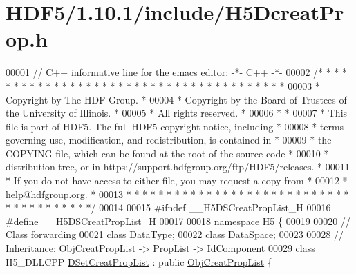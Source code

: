 \hypertarget{_h_d_f5_21_810_81_2include_2_h5_dcreat_prop_8h_source}{}\section{H\+D\+F5/1.10.1/include/\+H5\+Dcreat\+Prop.h}
\label{_h_d_f5_21_810_81_2include_2_h5_dcreat_prop_8h_source}

\begin{DoxyCode}
00001 \textcolor{comment}{// C++ informative line for the emacs editor: -*- C++ -*-}
00002 \textcolor{comment}{/* * * * * * * * * * * * * * * * * * * * * * * * * * * * * * * * * * * * * * *}
00003 \textcolor{comment}{ * Copyright by The HDF Group.                                               *}
00004 \textcolor{comment}{ * Copyright by the Board of Trustees of the University of Illinois.         *}
00005 \textcolor{comment}{ * All rights reserved.                                                      *}
00006 \textcolor{comment}{ *                                                                           *}
00007 \textcolor{comment}{ * This file is part of HDF5.  The full HDF5 copyright notice, including     *}
00008 \textcolor{comment}{ * terms governing use, modification, and redistribution, is contained in    *}
00009 \textcolor{comment}{ * the COPYING file, which can be found at the root of the source code       *}
00010 \textcolor{comment}{ * distribution tree, or in https://support.hdfgroup.org/ftp/HDF5/releases.  *}
00011 \textcolor{comment}{ * If you do not have access to either file, you may request a copy from     *}
00012 \textcolor{comment}{ * help@hdfgroup.org.                                                        *}
00013 \textcolor{comment}{ * * * * * * * * * * * * * * * * * * * * * * * * * * * * * * * * * * * * * * */}
00014 
00015 \textcolor{preprocessor}{#ifndef \_\_H5DSCreatPropList\_H}
00016 \textcolor{preprocessor}{#define \_\_H5DSCreatPropList\_H}
00017 
00018 \textcolor{keyword}{namespace }\hyperlink{namespace_h5}{H5} \{
00019 
00020 \textcolor{comment}{// Class forwarding}
00021 \textcolor{keyword}{class }DataType;
00022 \textcolor{keyword}{class }DataSpace;
00023 
00028 \textcolor{comment}{//  Inheritance: ObjCreatPropList -> PropList -> IdComponent}
\hyperlink{class_h5_1_1_d_set_creat_prop_list}{00029} \textcolor{keyword}{class }H5\_DLLCPP \hyperlink{class_h5_1_1_d_set_creat_prop_list}{DSetCreatPropList} : \textcolor{keyword}{public} \hyperlink{class_h5_1_1_obj_creat_prop_list}{ObjCreatPropList} \{

\end{DoxyCode}
